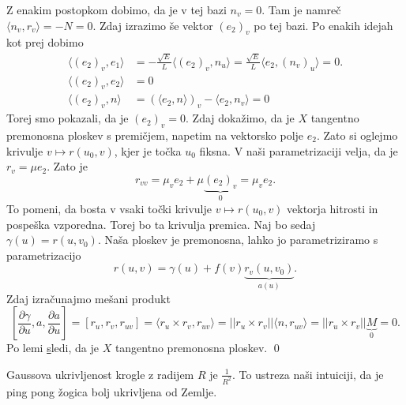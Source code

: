 Z enakim postopkom dobimo, da je v tej bazi $n_v = 0$. Tam je namreč $\langle n_v, r_v \rangle = - N = 0.$
Zdaj izrazimo še vektor $(e_2)_v$ po tej bazi. Po enakih idejah kot prej dobimo \begin{align*}
  \langle (e_2)_v, e_1 \rangle &=  -\frac{\sqrt{E} }{L} \langle (e_2)_v, n_u \rangle = \frac{\sqrt{E}}{L} \langle e_2, (n_v)_u \rangle = 0.  \\
  \langle (e_2)_v, e_2 \rangle   &= 0 \\
  \langle (e_2)_v, n \rangle &= (\langle e_2, n \rangle)_v - \langle e_2, n_v \rangle = 0   
\end{align*}
Torej smo pokazali, da je $(e_2)_v = 0$. Zdaj dokažimo, da je $X$ tangentno premonosna ploskev s premičjem, napetim
na vektorsko polje $e_2$. Zato si oglejmo krivulje $v \mapsto r(u_0, v)$, kjer je točka $u_0$ fiksna. V naši parametrizaciji velja,
da je $r_v = \mu e_2$. Zato je \begin{equation*}
r_{vv} = \mu_v e_2 + \mu \underbrace{ (e_2)_v}_0  = \mu_v e_2.
\end{equation*}  
To pomeni, da bosta v vsaki točki krivulje $v \mapsto r(u_0, v)$ vektorja hitrosti in pospeška vzporedna. Torej bo ta krivulja premica. Naj bo sedaj
$\gamma(u) = r(u, v_0)$. Naša ploskev je premonosna, lahko jo parametriziramo s parametrizacijo \begin{equation*}
r(u,v) = \gamma(u) + f(v) \underbrace{r_v(u, v_0)}_{a(u)}. 
\end{equation*}  
Zdaj izračunajmo mešani produkt \begin{equation*}
\left[ \frac{ \partial \gamma }{ \partial u }, a , \frac{ \partial a }{ \partial u }  \right] = \left[ r_u, r_v, r_{uv} \right]
= \langle r_u \times  r_v, r_{uv} \rangle = \lvert\lvert r_u \times  r_v \rvert\rvert \langle n, r_{uv} \rangle
= \lvert\lvert r_u \times r_v \rvert\rvert \underbrace{M}_0  = 0.
\end{equation*}  
Po lemi \href{lem_tangentno_premonosna_mesani_produkt} sledi, da je $X$ tangentno premonosna ploskev.
\qed

\begin{opomba}
Gaussova ukrivljenost krogle z radijem $R$ je $\frac{1}{R^2}$. To ustreza naši intuiciji, da je ping pong žogica bolj ukrivljena od Zemlje.
\end{opomba}